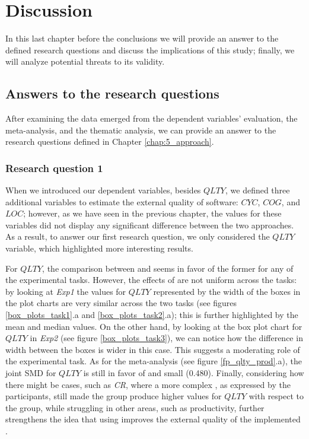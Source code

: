 \chapter{Discussion}
\label{chap:6_discussion}
In this last chapter before the conclusions we will provide an answer to the defined research questions and discuss the implications of this study; finally, we will analyze potential threats to its validity.

\section{Answers to the research questions}
After examining the data emerged from the dependent variables' evaluation, the meta-analysis, and the thematic analysis, we can provide an answer to the research questions defined in Chapter \ref{chap:5_approach}.



\subsection{Research question 1}
When we introduced our dependent variables, besides $QLTY$, we defined three additional variables to estimate the external quality of software: $CYC$, $COG$, and $LOC$; however, as we have seen in the previous chapter, the values for these variables did not display any significant difference between the two approaches. As a result, to answer our first research question, we only considered the $QLTY$ variable, which highlighted more interesting results.

For $QLTY$, the comparison between \tdd and \notdd seems in favor of the former for any of the experimental tasks. However, the effects of \tdd are not uniform across the tasks: by looking at \textit{Exp1} the values for $QLTY$ represented by the width of the boxes in the plot charts are very similar across the two tasks (see figures \ref{box_plots_task1}.a and \ref{box_plots_task2}.a); this is further highlighted by the mean and median values. 
On the other hand, by looking at the box plot chart for $QLTY$ in \textit{Exp2} (see figure \ref{box_plots_task3}), we can notice how the difference in width between the boxes is wider in this case. This suggests a moderating role of the experimental task.
As for the meta-analysis (see figure \ref{fp_qlty_prod}.a), the joint SMD for $QLTY$ is still in favor of \tdd and small (0.480).
Finally, considering how there might be cases, such as \textit{CR}, where a more complex \es, as expressed by the participants, still made the \tdd group produce higher values for $QLTY$ with respect to the \notdd group, while struggling in other areas, such as productivity, further strengthens the idea that using \tdd improves the external quality of the implemented \es.




